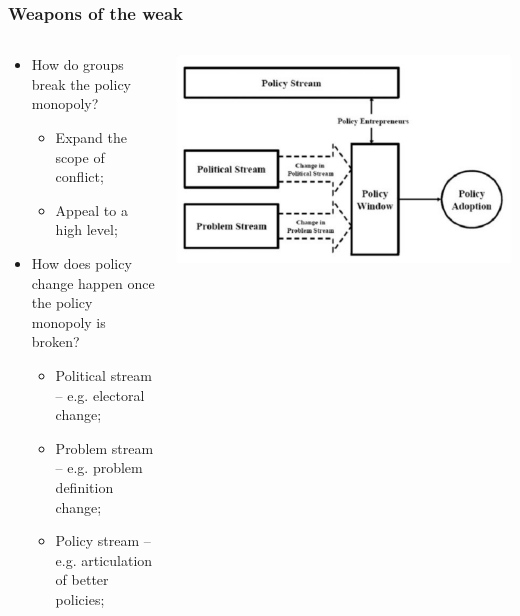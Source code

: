 \documentclass[aspectratio=169]{beamer}
\theoremstyle{principle}
\begin{document}
\begin{frame}
\frametitle{Weapons of the weak}
\begin{columns}

\begin{column}{0.5\textwidth}

\begin{itemize}
\item How do groups break the policy monopoly?
\begin{itemize}
\item Expand the scope of conflict;
\item Appeal to a high level;
\end{itemize}
\bigskip
\item How does policy change happen once the policy monopoly is broken?
\begin{itemize}
\item Political stream -- e.g. electoral change;
\item Problem stream -- e.g. problem definition change;
\item Policy stream -- e.g. articulation of better policies;
\end{itemize}
\end{itemize}
\end{column}
\begin{column}{0.5\textwidth}
    \begin{center}
     \includegraphics[scale=0.3]{windows.png}
     \end{center}
\end{column}
\end{columns}
\end{frame}
\end{document}

